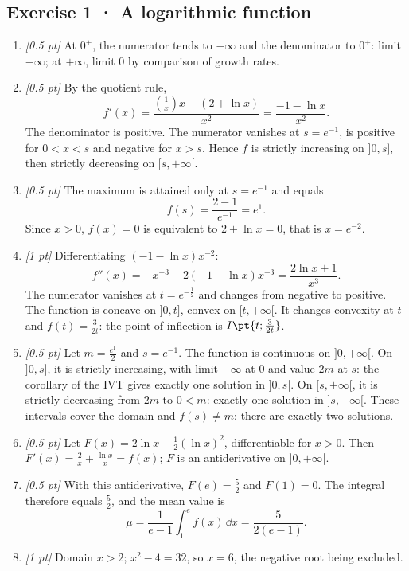 \subsection*{Exercise 1 · A logarithmic function}\begin{enumerate}

\item \textit{[0.5 pt]} At $0^+$, the numerator tends to $-\infty$ and the denominator to $0^+$: limit $-\infty$; at $+\infty$, limit $0$ by comparison of growth rates.

\item \textit{[0.5 pt]} By the quotient rule,
\[f'(x)=\frac{(\frac{1}{x})x-(2+\ln x)}{x^2}=\frac{-1-\ln x}{x^2}.\]
The denominator is positive. The numerator vanishes at $s=e^{-1}$, is positive for $0<x<s$ and negative for $x>s$. Hence $f$ is strictly increasing on $]0,s]$, then strictly decreasing on $[s,+\infty[$.

\item \textit{[0.5 pt]} The maximum is attained only at $s=e^{-1}$ and equals
\[f(s)=\frac{2- 1}{e^{-1}}=e^{1}.\]
Since $x>0$, $f(x)=0$ is equivalent to $2+\ln x=0$, that is $x=e^{-2}$.

\item \textit{[1 pt]} Differentiating $(-1-\ln x)x^{-2}$:
\[f''(x)=-x^{-3}-2(-1-\ln x)x^{-3}=\frac{2\ln x+1}{x^3}.\]
The numerator vanishes at $t=e^{-\frac{1}{2}}$ and changes from negative to positive. The function is concave on $]0,t]$, convex on $[t,+\infty[$. It changes convexity at $t$ and $f(t)=\frac{3}{2t}$: the point of inflection is $I\pt{t;\frac{3}{2t}}$.

\item \textit{[0.5 pt]} Let $m=\frac{e^{1}}{2}$ and $s=e^{-1}$. The function is continuous on $]0,+\infty[$. On $]0,s]$, it is strictly increasing, with limit $-\infty$ at $0$ and value $2m$ at $s$: the corollary of the IVT gives exactly one solution in $]0,s[$. On $[s,+\infty[$, it is strictly decreasing from $2m$ to $0<m$: exactly one solution in $]s,+\infty[$. These intervals cover the domain and $f(s)\ne m$: there are exactly two solutions.

\item \textit{[0.5 pt]} Let $F(x)=2\ln x+\frac12(\ln x)^2$, differentiable for $x>0$. Then $F'(x)=\frac{2}{x}+\frac{\ln x}{x}=f(x)$; $F$ is an antiderivative on $]0,+\infty[$.

\item \textit{[0.5 pt]} With this antiderivative, $F(e)=\frac{5}{2}$ and $F(1)=0$. The integral therefore equals $\frac{5}{2}$, and the mean value is
\[\mu=\frac{1}{e-1}\int_1^e f(x)\,\dd x=\frac{5}{2(e-1)}.\]

\item \textit{[1 pt]} Domain $x>2$; $x^2-4=32$, so $x=6$, the negative root being excluded.

\end{enumerate}


